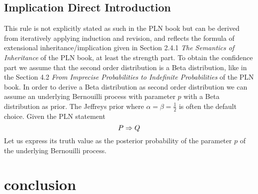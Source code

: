 \documentclass[]{article}
\begin{document}
\subsection{Implication Direct Introduction}
This rule is not explicitly stated as such in the PLN book but can be
derived from iteratively applying induction and revision, and reflects
the formula of extensional inheritance/implication given in Section
2.4.1 \emph{The Semantics of Inheritance} of the PLN book, at least
the strength part.  To obtain the confidence part we assume that the
second order distribution is a Beta distribution, like in the Section
4.2 \emph{From Imprecise Probabilities to Indefinite Probabilities} of
the PLN book.  In order to derive a Beta distribution as second order
distribution we can assume an underlying Bernouilli process with
parameter $p$ with a Beta distribution as prior.  The Jeffreys prior
where $\alpha=\beta=\frac{1}{2}$ is often the default choice.  Given
the PLN statement
$$P \Rightarrow Q$$ Let us express its truth value as the posterior
probability of the parameter $p$ of the underlying Bernouilli process.

\section{conclusion}



\end{document}
